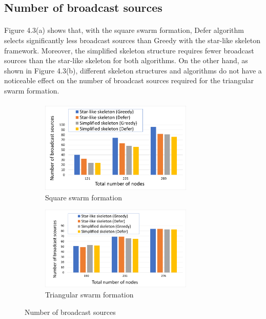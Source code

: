 \documentclass[a4paper,12pt]{report}
\begin{document}
\subsection{Number of broadcast sources}

\paragraph{}
Figure 4.3(a) shows that, with the square swarm formation, Defer algorithm selects significantly less broadcast sources than Greedy with the star-like skeleton framework. Moreover, the simplified skeleton structure requires fewer broadcast sources than the star-like skeleton for both algorithms. On the other hand, as shown in Figure 4.3(b), different skeleton structures and algorithms do not have a noticeable effect on the number of broadcast sources required for the triangular swarm formation.

\paragraph{}
\begin{figure}[tbph]
    \begin{subfigure}{1\linewidth}
    \centering
        \includegraphics[width=0.8\textwidth]{images/results_broadcasts_square.png}
        \caption{Square swarm formation}
    \end{subfigure}
    
    \vspace{1cm}
    \begin{subfigure}{1\linewidth}
    \centering
        \includegraphics[width=0.8\textwidth]{images/results_broadcasts_triangular.png}
        \caption{Triangular swarm formation}
    \end{subfigure}
\caption{Number of broadcast sources}
\end{figure}
\end{document}
